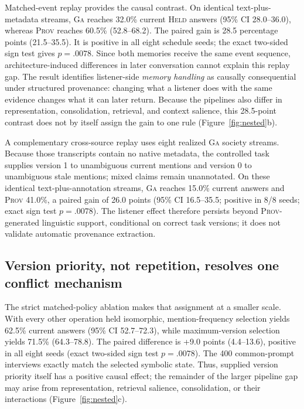 \documentclass[sigconf,anonymous]{acmart}
\newcommand{\held}{\textsc{Held}}
\newcommand{\prov}{\textsc{Prov}}
\newcommand{\ga}{\textsc{Ga}}
\begin{document}
Matched-event replay provides the causal contrast.  On identical text-plus-metadata streams,
\ga{} reaches 32.0\% current \held{} answers (95\% CI 28.0--36.0), whereas \prov{} reaches 60.5\%
(52.8--68.2).  The paired gain is 28.5 percentage points (21.5--35.5).  It is positive in all
eight schedule seeds; the exact two-sided sign test gives $p=.0078$.  Since both memories receive
the same event sequence, architecture-induced differences in later conversation cannot explain
this replay gap.  The result identifies listener-side \emph{memory handling} as causally
consequential under structured provenance: changing what a listener does with the same evidence
changes what it can later return.  Because the pipelines also differ in representation,
consolidation, retrieval, and context salience, this 28.5-point contrast does not by itself assign
the gain to one rule (Figure~\ref{fig:nested}b).

A complementary cross-source replay uses eight realized \ga{} society streams.  Because those
transcripts contain no native metadata, the controlled task supplies version 1 to unambiguous
current mentions and version 0 to unambiguous stale mentions; mixed claims remain unannotated.
On these identical text-plus-annotation streams, \ga{} reaches 15.0\% current answers and \prov{}
41.0\%, a paired gain of 26.0 points (95\% CI 16.5--35.5; positive in 8/8 seeds; exact sign test
$p=.0078$).  The listener effect therefore persists beyond \prov{}-generated linguistic support,
conditional on correct task versions; it does not validate automatic provenance extraction.

\subsection{Version priority, not repetition, resolves one conflict mechanism}

The strict matched-policy ablation makes that assignment at a smaller scale.  With every other
operation held isomorphic, mention-frequency selection yields 62.5\% current answers (95\% CI
52.7--72.3), while maximum-version selection yields 71.5\% (64.3--78.8).  The paired difference
is +9.0 points (4.4--13.6), positive in all eight seeds (exact two-sided sign test $p=.0078$).
The 400 common-prompt interviews exactly match the selected symbolic state.  Thus, supplied
version priority itself has a positive causal effect; the remainder of the larger pipeline gap
may arise from representation, retrieval salience, consolidation, or their interactions
(Figure~\ref{fig:nested}c).
\end{document}
